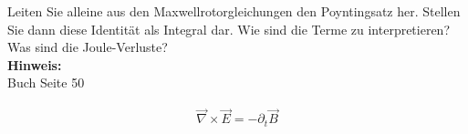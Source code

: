 \begin{question}[section=2,subsection=23,name={Poynting Satz},difficulty=5,type=mdl,mode=exm,tags={}]
	Leiten Sie alleine aus den Maxwellrotorgleichungen den Poyntingsatz her. Stellen Sie dann diese Identit\"at als Integral dar. Wie sind die Terme zu interpretieren? Was sind die Joule-Verluste?
	\\ \textbf{Hinweis:}\\
	Buch Seite 50
\end{question}
\begin{solution}
	\begin{align}
		\vec \nabla \times \vec E = - \partial _t \vec B
	\end{align}
\end{solution}